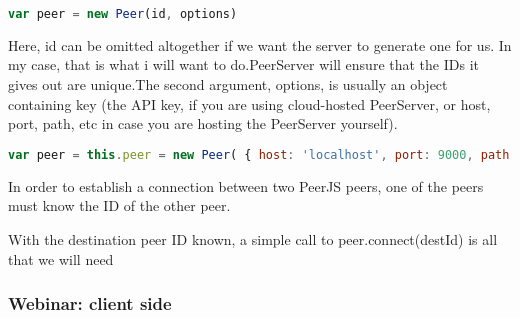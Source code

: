 \begin{lstlisting}[language=javascript]
var peer = new Peer(id, options)
\end{lstlisting}

Here, id can be omitted altogether if we want the server to generate one for us. In my case, that is what i will want to do.PeerServer will ensure that the IDs it gives out are unique.The second argument, options, is usually an object containing key (the API key, if you are using cloud-hosted PeerServer, or host, port, path, etc in case you are hosting the PeerServer yourself).

\begin{lstlisting}[language=javascript]
var peer = this.peer = new Peer( { host: 'localhost', port: 9000, path: '/peerjs'});
\end{lstlisting}

In order to establish a connection between two PeerJS peers, one of the peers must know the ID of the other peer.

With the destination peer ID known, a simple call to peer.connect(destId) is all that we will need

\subsubsection{Webinar: client side}

